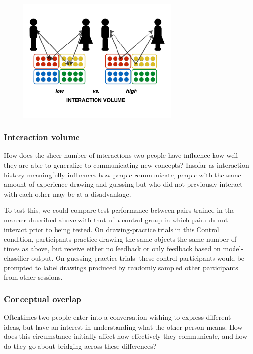 \documentclass[12pt]{article}
\begin{document}
\begin{figure}[hbtp]
\begin{center}
\includegraphics[width=80mm]{figures/interaction_volume.pdf}
\end{center}
\end{figure}
\vspace{-5mm}

\subsubsection{Interaction volume} How does the sheer number of interactions two people have influence how well they are able to generalize to communicating new concepts? Insofar as interaction history meaningfully influences how people communicate, people with the same amount of experience drawing and guessing but who did not previously interact with each other may be at a disadvantage. 

To test this, we could compare test performance between pairs trained in the manner described above with that of a control group in which pairs do not interact prior to being tested. On drawing-practice trials in this Control condition, participants practice drawing the same objects the same number of times as above, but receive either no feedback or only feedback based on model-classifier output. On guessing-practice trials, these control participants would be prompted to label drawings produced by randomly sampled other participants from other sessions. 

\subsubsection{Conceptual overlap} Oftentimes two people enter into a conversation wishing to express different ideas, but have an interest in understanding what the other person means. How does this circumstance initially affect how effectively they communicate, and how do they go about bridging across these differences? 
\end{document}
